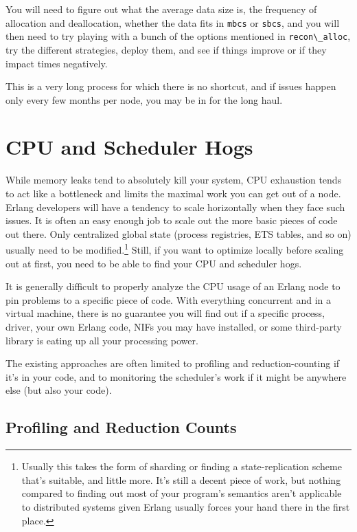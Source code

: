 \documentclass[11pt, oneside]{book}   	%
\newcommand{\module}[1]{\Verb`#1`}
\newcommand{\term}[1]{\Verb`#1`}
\begin{document}
You will need to figure out what the average data size is, the frequency of allocation and deallocation, whether the data fits in \term{mbcs} or \term{sbcs},  and you will then need to try playing with a bunch of the options mentioned in \module{recon\_alloc}, try the different strategies, deploy them, and see if things improve or if they impact times negatively.

This is a very long process for which there is no shortcut, and if issues happen only every few months per node, you may be in for the long haul. 



\chapter{CPU and Scheduler Hogs}
\label{chap:cpu-hogs}

While memory leaks tend to absolutely kill your system, CPU exhaustion tends to act like a bottleneck and limits the maximal work you can get out of a node. Erlang developers will have a tendency to scale horizontally when they face such issues. It is often an easy enough job to scale out the more basic pieces of code out there. Only centralized global state (process registries, ETS tables, and so on) usually need to be modified.\footnote{Usually this takes the form of sharding or finding a state-replication scheme that's suitable, and little more. It's still a decent piece of work, but nothing compared to finding out most of your program's semantics aren't applicable to distributed systems given Erlang usually forces your hand there in the first place.} Still, if you want to optimize locally before scaling out at first, you need to be able to find your CPU and scheduler hogs.

It is generally difficult to properly analyze the CPU usage of an Erlang node to pin problems to a specific piece of code. With everything concurrent and in a virtual machine, there is no guarantee you will find out if a specific process, driver, your own Erlang code, NIFs you may have installed, or some third-party library is eating up all your processing power.

The existing approaches are often limited to profiling and reduction-counting if it's in your code, and to monitoring the scheduler's work if it might be anywhere else (but also your code).

\section{Profiling and Reduction Counts}
\label{sec:cpu-profiling}
\end{document}
